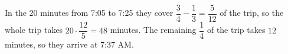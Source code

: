 In the $20$ minutes from 7:05 to 7:25 they cover $\dfrac{3}{4}-\dfrac{1}{3}=\dfrac{5}{12}$ of the trip, so the whole trip takes $20\cdot\dfrac{12}{5}=48$ minutes. The remaining $\dfrac{1}{4}$ of the trip takes $12$ minutes, so they arrive at $\boxed{\text{7:37 AM}}$.
